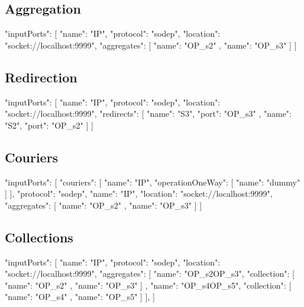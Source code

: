 \subsection{Aggregation}
\begin{jsonlisting}[][caption={Aggregation represented in JSON of an input port}, label={lst:appen_aggregates}]
{
  "inputPorts": [
    {
      "name": "IP",
      "protocol": "sodep",
      "location": "socket://localhost:9999",
      "aggregates": [
        {
          "name": "OP_s2"
        },
        {
          "name": "OP_s3"
        }
      ]
    }
  ]
}
\end{jsonlisting}

\subsection{Redirection}
\begin{jsonlisting}[][caption={Redirection represented in JSON of an input port}, label={lst:appen_redirects}]
{
    "inputPorts": [
        {
            "name": "IP",
            "protocol": "sodep",
            "location": "socket://localhost:9999",
            "redirects": [
                {
                    "name": "S3",
                    "port": "OP_s3"
                },
                {
                  "name": "S2",
                  "port": "OP_s2"
                }
            ]
        }
    ]
}
\end{jsonlisting}

\subsection{Couriers}
\begin{jsonlisting}[][caption={Couriers represented in JSON of an input port}, label={lst:appen_couriers}]
{
  "inputPorts": [
    {
      "couriers": [
        {
          "name": "IP",
          "operationOneWay": [
            {
              "name": "dummy"
            }
          ]
        }
      ],
      "protocol": "sodep",
      "name": "IP",
      "location": "socket://localhost:9999",
      "aggregates": [
        {
          "name": "OP_s2"
        },
        {
          "name": "OP_s3"
        }
      ]
    }
  ]
}
\end{jsonlisting}

\subsection{Collections}
\begin{jsonlisting}[][caption={Collections represented in JSON of an input port}, label={lst:appen_collection}]
{
  "inputPorts": [
    {
      "name": "IP",
      "protocol": "sodep",
      "location": "socket://localhost:9999",
      "aggregates": [
        {
          "name": "OP_s2OP_s3",
          "collection": [
            {
              "name": "OP_s2"
            },
            {
              "name": "OP_s3"
            }
          ]
        },
        {
          "name": "OP_s4OP_s5",
          "collection": [
            {
              "name": "OP_s4"
            },
            {
              "name": "OP_s5"
            }
          ]
        }
      ],
    }
  ]
}
\end{jsonlisting}